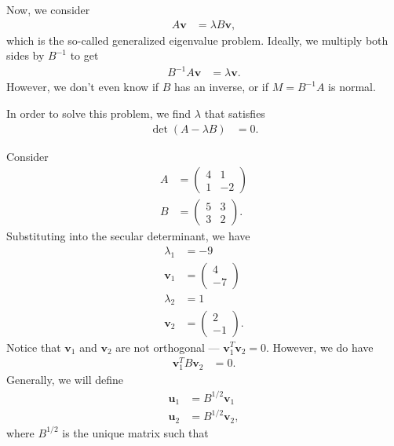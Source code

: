 \documentclass[10pt]{mypackage}
\begin{document}
Now, we consider
\begin{align*}
  A\mathbf{v} &= \lambda B\mathbf{v},
\end{align*}
which is the so-called generalized eigenvalue problem. Ideally, we multiply both sides by $B^{-1}$ to get
\begin{align*}
  B^{-1}A\mathbf{v} &= \lambda \mathbf{v}.
\end{align*}
However, we don't even know if $B$ has an inverse, or if $M = B^{-1}A$ is normal.\newline

In order to solve this problem, we find $\lambda$ that satisfies
\begin{align*}
  \det\left(A - \lambda B\right) &= 0.
\end{align*}
\begin{example}
  Consider
  \begin{align*}
    A &= \begin{pmatrix}4 & 1 \\ 1 & -2\end{pmatrix}\\
    B &= \begin{pmatrix}5 & 3 \\ 3 & 2\end{pmatrix}.
  \end{align*}
  Substituting into the secular determinant, we have
  \begin{align*}
    \lambda_1 &= -9\\
    \mathbf{v}_1 &= \begin{pmatrix}4\\-7\end{pmatrix}\\
    \lambda_2 &= 1\\
    \mathbf{v}_2 &= \begin{pmatrix}2\\-1\end{pmatrix}.
  \end{align*}
  Notice that $\mathbf{v}_1$ and $\mathbf{v}_2$ are not orthogonal --- $\mathbf{v}_1^{T} \mathbf{v}_2 = 0$. However, we do have 
  \begin{align*}
    \mathbf{v}_1^{T} B \mathbf{v}_2 &= 0.
  \end{align*}
  Generally, we will define
  \begin{align*}
    \mathbf{u}_1 &= B^{1/2}\mathbf{v}_1\\
    \mathbf{u}_2 &= B^{1/2}\mathbf{v}_2,
  \end{align*}
  where $B^{1/2}$ is the unique matrix such that

\end{example}
\end{document}
